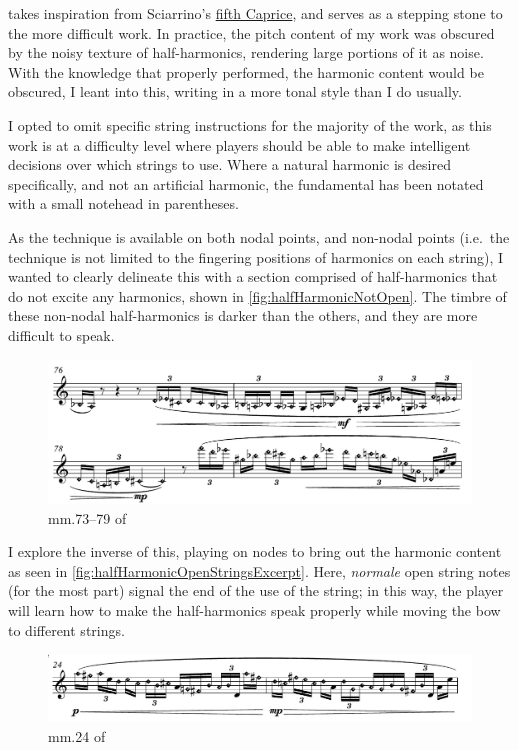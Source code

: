\violinPiece\space takes inspiration from Sciarrino's \hyperref[fig:sciarrinoExcerpt]{fifth Caprice}, and serves as a stepping stone to the more difficult work.\autocite[]{sciarrinoCapricciViolino1976} 
In practice, the pitch content of my work was obscured by the noisy texture of half-harmonics, rendering large portions of it as noise. 
With the knowledge that properly performed, the harmonic content would be obscured, I leant into this, writing in a more tonal style than I do usually.

I opted to omit specific string instructions for the majority of the work, as this work is at a difficulty level where players should be able to make intelligent decisions over which strings to use.
Where a natural harmonic is desired specifically, and not an artificial harmonic, the fundamental has been notated with a small notehead in parentheses. 

As the technique is available on both nodal points, and non-nodal points (i.e.\ the technique is not limited to the fingering positions of harmonics on each string), I wanted to clearly delineate this with a section comprised of half-harmonics that do not excite any harmonics, shown in \autoref{fig:halfHarmonicNotOpen}. 
The timbre of these non-nodal half-harmonics is darker than the others, and they are more difficult to speak.\autocite[]{smithFeedbackCelloSightreading2019}
\begin{figure}
  \includegraphics[width=\linewidth]{./resources/halfHarmonicNotOpen.pdf}
  \caption{mm.\@ 73--79 of \violinPiece}\label{fig:halfHarmonicNotOpen}
\end{figure}


I explore the inverse of this, playing on nodes to bring out the harmonic content as seen in \autoref{fig:halfHarmonicOpenStringsExcerpt}.
Here, \emph{normale} open string notes (for the most part) signal the end of the use of the string; in this way, the player will learn how to make the half-harmonics speak properly while moving the bow to different strings.

\begin{figure}
  \includegraphics[width=\linewidth]{./resources/halfHarmonicOpenStringsExcerpt.pdf}
  \caption{mm.\@ 24 of \violinPiece}\label{fig:halfHarmonicOpenStringsExcerpt}
\end{figure}

